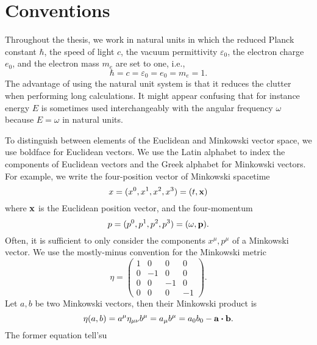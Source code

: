 \section{Conventions}

Throughout the thesis, we work in natural units in which the reduced Planck constant $\hbar$, the speed of light $c$, the vacuum permittivity $\varepsilon_0$, the electron charge $e_0$, and the electron mass $m_e$ are set to one, i.e.,
\begin{equation}
	\hbar
	=
	c
	=
	\varepsilon_0
	=
	e_0
	=
	m_e
	=
	1
	.
\end{equation}
The advantage of using the natural unit system is that it reduces the clutter when performing long calculations.
It might appear confusing that for instance energy $E$ is sometimes used interchangeably with the angular frequency $\omega$ because $E=\omega$ in natural units.

To distinguish between elements of the Euclidean and Minkowski vector space, we use boldface for Euclidean vectors.
We use the Latin alphabet to index the components of Euclidean vectors and the Greek alphabet for Minkowski vectors.
For example, we write the four-position vector of Minkowski spacetime
\begin{equation}
	x
	=
	(x^0,x^1,x^2,x^3)
	=
	(t,\vb{x})
\end{equation}
where $\vb{x}$ is the Euclidean position vector, and the four-momentum
\begin{equation}
	p
	=
	(p^0,p^1,p^2,p^3)
	=
	(\omega,\vb{p})
	.
\end{equation}
Often, it is sufficient to only consider the components $x^\mu,p^\mu$ of a Minkowski vector.
We use the mostly-minus convention for the Minkowski metric
\begin{equation}
	\eta
	=
	\begin{pmatrix}
		1 & 0 & 0 & 0 \\
		0 & -1 & 0 & 0 \\
		0 & 0 & -1 & 0 \\
		0 & 0 & 0 & -1
	\end{pmatrix}
	.
\end{equation}
Let $a,b$ be two Minkowski vectors, then their Minkowski product is
\begin{equation}
	\eta(a,b)
	=
	a^\mu
	\eta_{\mu\nu}
	b^\mu
	=
	a_\mu
	b^\mu
	=
	a_0b_0
	-
	\vb{a}\vdot\vb{b}
	.
\end{equation}
The former equation tell'su 